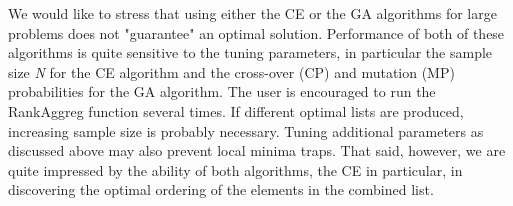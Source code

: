 \documentclass[11pt]{article}
\begin{document}
We would like to stress that using either the CE or the GA algorithms for large problems 
does not "guarantee" an optimal solution. Performance of both of these algorithms is quite 
sensitive to the tuning parameters, in particular the sample size \emph{N} for the CE algorithm and
the cross-over (CP) and mutation (MP) probabilities for the GA algorithm. The user is encouraged to run the
RankAggreg function several times. If different optimal lists are produced, increasing sample
size is probably necessary. Tuning additional parameters as discussed above may also
prevent local minima traps. That said, however, we are quite impressed by the ability of both
algorithms, the CE in particular, in discovering the optimal ordering of the elements in the
combined list.




{\small
  
  
}
\end{document}
